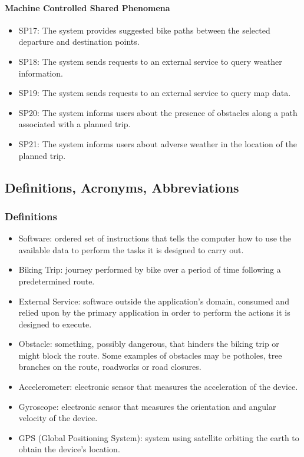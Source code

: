 \paragraph{Machine Controlled Shared Phenomena}
\begin{itemize}
    \item SP17: The system provides suggested bike paths between the selected departure and destination points.
    \item SP18: The system sends requests to an external service to query weather information.
    \item SP19: The system sends requests to an external service to query map data.
    \item SP20: The system informs users about the presence of obstacles along a path associated with a planned trip.
    \item SP21: The system informs users about adverse weather in the location of the planned trip.
\end{itemize}

\subsection{Definitions, Acronyms, Abbreviations} %
\subsubsection{Definitions}
\begin{itemize}
    \item Software: ordered set of instructions that tells the computer how to use the available data to perform the tasks it is designed to carry out.
    \item Biking Trip: journey performed by bike over a period of time following a predetermined route.
    \item External Service: software outside the application’s domain, consumed and relied upon by the primary application in order to perform the actions it is designed to execute.
    \item Obstacle: something, possibly dangerous, that hinders the biking trip or might block the route. Some examples of obstacles may be potholes, tree branches on the route, roadworks or road closures.
    \item Accelerometer: electronic sensor that measures the acceleration of the device.
    \item Gyroscope: electronic sensor that measures the orientation and angular velocity of the device.
    \item GPS (Global Positioning System): system using satellite orbiting the earth to obtain the device’s location. 
\end{itemize}

